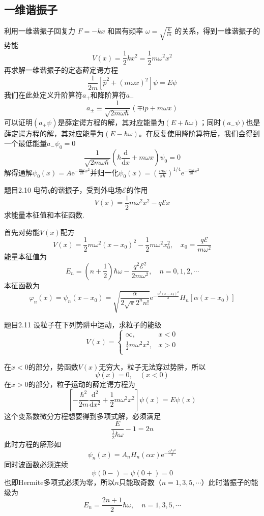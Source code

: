 \subsection{一维谐振子}
利用一维谐振子回复力 $F=-kx$ 和固有频率 $\omega=\sqrt{\frac{k}{m}}$ 的关系，得到一维谐振子的势能
$$
    V(x)=\frac{1}{2}kx^2=\frac{1}{2}m\omega^2x^2
$$
再求解一维谐振子的定态薛定谔方程
$$
    \frac{1}{2m}\left[ \hat{p}^2+(m\omega x)^2 \right]\psi=E\psi
$$
我们在此处定义升阶算符$a_{+}$和降阶算符$a_{-}$
$$
    a_{\pm} \equiv \frac{1}{\sqrt{2m\omega\hbar}}\left(\mp\mathrm{i}p+m\omega x \right)
$$
可以证明$(a_{+}\psi)$是薛定谔方程的解，其对应能量为$(E+\hbar\omega)$；同时$(a_{-}\psi)$也是薛定谔方程的解，其对应能量为$(E-\hbar\omega)$。在反复使用降阶算符后，我们会得到一个最低能量$a_{-}\psi_0=0$
$$
    \frac{1}{\sqrt{2m\omega\hbar}}\left(\hbar\frac{\mathrm{d}}{\mathrm{d}x}+m\omega x\right)\psi_0=0
$$
解得通解$\psi_0(x)=A\mathrm{e}^{-\frac{m\omega}{2\hbar}x^2}$并归一化$\psi_0(x)=\left(\frac{m\omega}{\pi\hbar}\right)^{1/4}\mathrm{e}^{-\frac{m\omega}{2\hbar}x^2}$
\begin{question}{题目2.10}
    电荷$q$的谐振子，受到外电场$\mathcal{E}$的作用
    $$
        V(x)=\frac{1}{2}m\omega^2x^2-q\mathcal{E}x
    $$
    求能量本征值和本征函数.
\end{question}
\begin{solution}
    首先对势能$V(x)$配方
    $$
        V(x)=\frac{1}{2}m\omega^2(x-x_0)^2-\frac{1}{2}m\omega^2x_0^2,
        \quad
        x_0=\frac{q\mathcal{E}}{m\omega^2}
    $$
    能量本征值为
    $$
        E_n = \left(n+\frac{1}{2}\right)\hbar\omega-\frac{q^2\mathcal{E}^2}{2m\omega^2}, \quad n = 0, 1, 2, \cdots
    $$
    本征函数为
    $$
        \varphi_n(x)
        = \psi_n(x-x_0)
        = \sqrt{\frac{\alpha}{2\sqrt{\pi}2^nn!}}\mathrm{e}^{-\frac{\alpha^2(x-x_0)^2}{2}}H_n[\alpha(x-x_0)]
    $$
\end{solution}



\begin{question}{题目2.11}
    设粒子在下列势阱中运动，求粒子的能级
    $$
        V(x)=\begin{cases}
            \infty,                  & x<0 \\
            \frac{1}{2}m\omega^2x^2, & x>0 \\
        \end{cases}
    $$
\end{question}
\begin{solution}
    在$x<0$的部分，势函数$V(x)$无穷大，粒子无法穿过势阱，所以
    $$
        \psi(x)=0, \quad (x<0)
    $$
    在$x>0$的部分，粒子运动的薛定谔方程为
    $$
        \left[-\frac{\hbar^2}{2m}\frac{\mathrm{d}^2}{\mathrm{d}x^2}+\frac{1}{2}m\omega^2x^2\right]\psi(x) = E\psi(x)
    $$
    这个变系数微分方程想要得到多项式解，必须满足
    $$
        \frac{E}{\frac{1}{2}\hbar\omega}-1=2n
    $$
    此时方程的解形如
    $$
        \psi_n(x)=A_nH_n(\alpha x)\mathrm{e}^{-\frac{\alpha^2x^2}{2}}
    $$
    同时波函数必须连续
    $$
        \psi(0-)=\psi(0+)=0
    $$
    也即Hermite多项式必须为零，所以$n$只能取奇数（$n=1,3,5,\cdots$）此时谐振子的能级为
    $$
        E_n = \frac{2n+1}{2}\hbar\omega,
        \quad
        n=1,3,5,\cdots
    $$
\end{solution}

